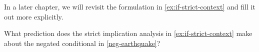 \noindent In a later chapter, we will revisit the formulation in
\ref{ex:if-strict-context} and fill it out more explicitly. 
 
\begin{exercise}
	What prediction does the strict implication analysis in
  \ref{ex:if-strict-context} make about the negated conditional in \ref{neg-earthquake}? \eex
\end{exercise}



